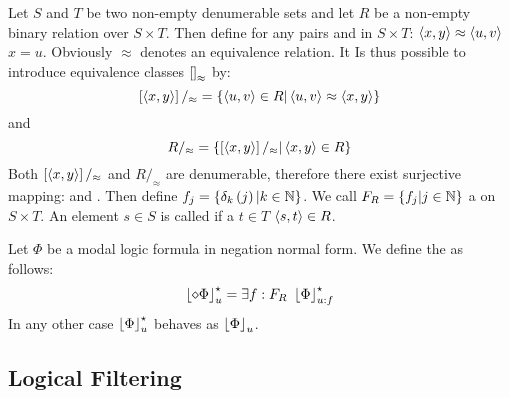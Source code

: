 \begin{defi}
Let $S$ and $T$ be two non-empty denumerable sets and let $R$ be a non-empty binary relation over $S\times T$. Then define for any pairs  and  in $S\times T$: $\left\langle x,y\right\rangle\approx\left\langle u,v\right\rangle$ \iffTx{} $x=u$. Obviously $\approx$ denotes an equivalence relation. It Is thus possible to introduce equivalence classes $\left[ \right]_{\approx}$ by:
\begin{equation}
\left[ \left\langle x,y\right\rangle\right]/_{\approx}=\left\{ \left\langle u,v\right\rangle\in R|\left\langle u,v\right\rangle\approx \left\langle x,y\right\rangle\right\}
\end{equation}
and
\begin{equation}
R/_{\approx}=\left\{ \left[ \left\langle x,y\right\rangle\right]/_{\approx}|\left\langle x,y\right\rangle\in R\right\}
\end{equation}
Both $\left[ \left\langle x,y\right\rangle\right]/_{\approx}$ and $R/_{\approx}$ are denumerable, therefore there exist surjective mapping:  and . Then define $f_j=\left\{ \delta_k\left(j\right)|k\in\mathbb{N}\right\}$. We call $F_R=\left\{ f_j|j\in\mathbb{N}\right\}$ a  on $S\times T$. An element $s\in S$ is called  if \teTx{} a $t\in T$ \stTx{} $\left\langle s,t\right\rangle\in R$.
\cite{conf/ijcai/Nonnengart93}
\end{defi}


\begin{defi}
Let $\Phi$ be a modal logic formula in negation normal form. We define the  as follows:
\begin{equation}
\floor{\diamond\Phi}_u^\star=\exists f:F_R\ \floor{\Phi}_{u:f}^\star
\end{equation}
In any other case $\left\lfloor \Phi\right\rfloor_u^\star$ behaves as $\left\lfloor \Phi\right\rfloor_u$.
\cite{conf/ijcai/Nonnengart93}
\end{defi}

\subsection{Logical Filtering}

